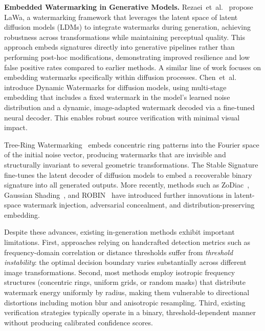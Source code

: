 \noindent\textbf{Embedded Watermarking in Generative Models.}
Rezaei~et~al.~\cite{rezaei2024lawa} propose LaWa, a watermarking framework that 
leverages the latent space of latent diffusion models (LDMs) to integrate watermarks 
during generation, achieving robustness across transformations while maintaining 
perceptual quality. This approach embeds signatures directly into generative pipelines 
rather than performing post-hoc modifications, demonstrating improved resilience and 
low false positive rates compared to earlier methods. A similar line of work focuses 
on embedding watermarks specifically within diffusion processes. 
Chen~et~al.~\cite{chen2025tagwm} introduce Dynamic Watermarks for diffusion models, 
using multi-stage embedding that includes a fixed watermark in the model's learned noise 
distribution and a dynamic, image-adapted watermark decoded via a fine-tuned neural 
decoder. This enables robust source verification with minimal visual impact.

Tree-Ring Watermarking~\cite{wen2023tree_ring} embeds concentric ring patterns into 
the Fourier space of the initial noise vector, producing watermarks that are invisible 
and structurally invariant to several geometric transformations. 
The Stable Signature~\cite{fernandez2023stable} fine-tunes the latent decoder of 
diffusion models to embed a recoverable binary signature into all generated outputs. 
More recently, methods such as ZoDiac~\cite{zhang2024attack}, 
Gaussian Shading~\cite{yang2024gaussian}, and ROBIN~\cite{huang2024robin} have 
introduced further innovations in latent-space watermark injection, adversarial concealment, and distribution-preserving embedding.

Despite these advances, existing in-generation methods exhibit important limitations. 
First, approaches relying on handcrafted detection metrics such as frequency-domain 
correlation or distance thresholds suffer from \emph{threshold instability}: the optimal 
decision boundary varies substantially across different image transformations. 
Second, most methods employ isotropic frequency structures (concentric rings, uniform 
grids, or random masks) that distribute watermark energy uniformly by radius, making 
them vulnerable to directional distortions including motion blur and anisotropic 
resampling. Third, existing verification strategies typically operate in a binary, 
threshold-dependent manner without producing calibrated confidence scores.


